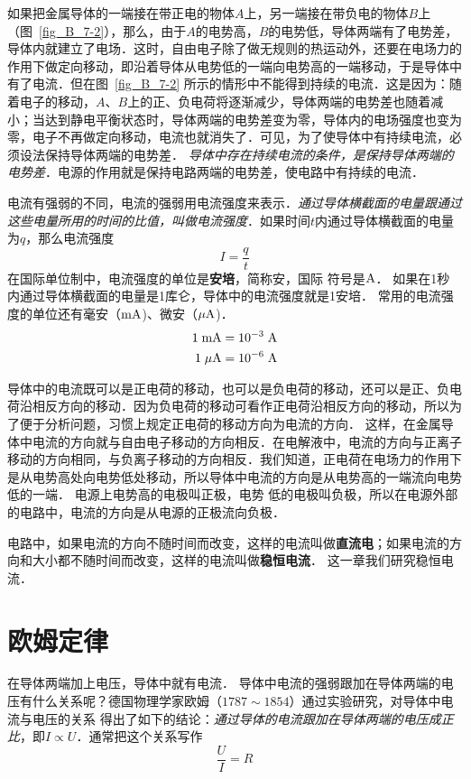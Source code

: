 如果把金属导体的一端接在带正电的物体$A$上，另一端接在带负电的物体$B$上（图~\ref{fig_B_7-2}），那么，由于$A$的电势高，$B$的电势低，导体两端有了电势差，导体内就建立了电场．这时，自由电子除了做无规则的热运动外，还要在电场力的作用下做定向移动，即沿着导体从电势低的一端向电势高的一端移动，于是导体中有了电流．但在图~\ref{fig_B_7-2} 所示的情形中不能得到持续的电流．这是因为：随着电子的移动，$A$、$B$上的正、负电荷将逐渐减少，导体两端的电势差也随着减小；当达到静电平衡状态时，导体两端的电势差变为零，导体内的电场强度也变为零，电子不再做定向移动，电流也就消失了．可见，为了使导体中有持续电流，必须设法保持导体两端的电势差．
\textit{导体中存在持续电流的条件，是保持导体两端的电势差}．电源的作用就是保持电路两端的电势差，使电路中有持续的电流．



电流有强弱的不同，电流的强弱用电流强度来表示．\textit{通过导体横截面的电量跟通过这些电量所用的时间的比值，叫做电流强度}．如果时间$t$内通过导体横截面的电量为$q$，那么电流强度
\[I=\frac{q}{t} \]
在国际单位制中，电流强度的单位是\textbf{安培}，简称安，国际
符号是$\text{A}$．
如果在1秒内通过导体横截面的电量是1库仑，导体中的电流强度就是1安培．
常用的电流强度的单位还有毫安（$\text{mA}$)、微安（$\mu\text{A}$)．
\[\begin{split}
    1 \;\text{mA} &= 10^{-3} \;\text{A}\\
    1 \;\mu\text{A} &=10^{-6} \;\text{A}
\end{split}\]

导体中的电流既可以是正电荷的移动，也可以是负电荷的移动，还可以是正、负电荷沿相反方向的移动．因为负电荷的移动可看作正电荷沿相反方向的移动，所以为了便于分析问题，习惯上规定正电荷的移动方向为电流的方向．
这样，在金属导体中电流的方向就与自由电子移动的方向相反．在电解液中，电流的方向与正离子移动的方向相同，与负离子移动的方向相反．我们知道，正电荷在电场力的作用下是从电势高处向电势低处移动，所以导体中电流的方向是从电势高的一端流向电势低的一端．
电源上电势高的电极叫正极，电势
低的电极叫负极，所以在电源外部的电路中，电流的方向是从电源的正极流向负极．

电路中，如果电流的方向不随时间而改变，这样的电流叫做\textbf{直流电}；如果电流的方向和大小都不随时间而改变，这样的电流叫做\textbf{稳恒电流}．
这一章我们研究稳恒电流．

\section{欧姆定律}
在导体两端加上电压，导体中就有电流．
导体中电流的强弱跟加在导体两端的电压有什么关系呢？德国物理学家欧姆（$1787 \sim 1854$）通过实验研究，对导体中电流与电压的关系
得出了如下的结论：\textit{通过导体的电流跟加在导体两端的电压成正比}，即$I\propto U$．通常把这个关系写作
\[\frac{U}{I}=R\]

